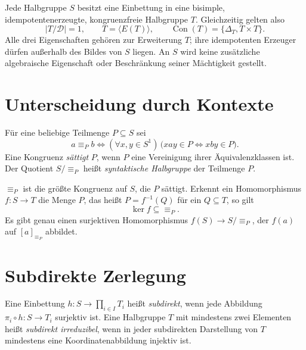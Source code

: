 \begin{theorem}
\label{b28guide:thm:howie-embedding}
Jede Halbgruppe $S$ besitzt eine Einbettung in eine bisimple,
idempotentenerzeugte, kongruenzfreie Halbgruppe $T$.
Gleichzeitig gelten also
\[
 |T/\mathcal D|=1,\qquad
 T=\langle E(T)\rangle,\qquad
 \operatorname{Con}(T)=\{\Delta_T,T\times T\}.
\]
Alle drei Eigenschaften gehören zur Erweiterung $T$;
ihre idempotenten Erzeuger dürfen außerhalb des Bildes von $S$ liegen.
An $S$ wird keine zusätzliche algebraische Eigenschaft
oder Beschränkung seiner Mächtigkeit gestellt.
\cite{howie1981}
\end{theorem}

\section{Unterscheidung durch Kontexte}

\begin{definition}
Für eine beliebige Teilmenge $P\subseteq S$ sei
\[
 a\equiv_P b
 \iff
 (\forall x,y\in S^1)\,
 \bigl(xay\in P\iff xby\in P\bigr).
\]
Eine Kongruenz \emph{sättigt} $P$, wenn $P$ eine Vereinigung
ihrer Äquivalenzklassen ist.
Der Quotient $S/{\equiv_P}$ heißt \emph{syntaktische Halbgruppe}
der Teilmenge $P$.
\end{definition}

\begin{theorem}
\label{b28guide:thm:syntactic}
$\equiv_P$ ist die größte Kongruenz auf $S$, die $P$ sättigt.
Erkennt ein Homomorphismus $f:S\to T$ die Menge $P$, das heißt
$P=f^{-1}(Q)$ für ein $Q\subseteq T$, so gilt
\[
 \ker f\subseteq{\equiv_P}.
\]
Es gibt genau einen surjektiven Homomorphismus
$f(S)\to S/{\equiv_P}$, der $f(a)$ auf $[a]_{\equiv_P}$ abbildet.
\cite{harju96}
\end{theorem}

\clearpage
\section{Subdirekte Zerlegung}

\begin{definition}
Eine Einbettung $h:S\to\prod_{i\in I}T_i$ heißt \emph{subdirekt},
wenn jede Abbildung $\pi_i\circ h:S\to T_i$ surjektiv ist.
Eine Halbgruppe $T$ mit mindestens zwei Elementen heißt
\emph{subdirekt irreduzibel}, wenn in jeder subdirekten Darstellung
von $T$ mindestens eine Koordinatenabbildung injektiv ist.
\end{definition}

